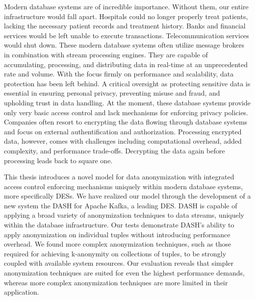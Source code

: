 Modern database systems are of incredible importance. Without them, our entire infrastructure would fall apart. Hospitals could no longer properly treat patients, lacking the necessary patient records and treatment history. Banks and financial services would be left unable to execute transactions. Telecommunication services would shut down. These modern database systems often utilize message brokers in combination with stream processing engines. They are capable of accumulating, processing, and distributing data in real-time at an unprecedented rate and volume. With the focus firmly on performance and scalability, data protection has been left behind. A critical oversight as protecting sensitive data is essential in ensuring personal privacy, preventing misuse and fraud, and upholding trust in data handling. At the moment, these database systems provide only very basic access control and lack mechanisms for enforcing privacy policies. Companies often resort to encrypting the data flowing through database systems and focus on external authentification and authorization. Processing encrypted data, however, comes with challenges including computational overhead, added complexity, and performance trade-offs. Decrypting the data again before processing leads back to square one. \par
This thesis introduces a novel model for data anonymization with integrated access control enforcing mechanisms uniquely within modern database systems, more specifically \acfp{DES}. We have realized our model through the development of a new system the \acf{DASH} for Apache Kafka, a leading \ac{DES}. \ac{DASH} is capable of applying a broad variety of anonymization techniques to data streams, uniquely within the database infrastructure. Our tests demonstrate \ac{DASH}'s ability to apply anonymization on individual tuples without introducing performance overhead. We found more complex anonymization techniques, such as those required for achieving k-anonymity on collections of tuples, to be strongly coupled with available system resources. Our evaluation reveals that simpler anonymization techniques are suited for even the highest performance demands, whereas more complex anonymization techniques are more limited in their application.